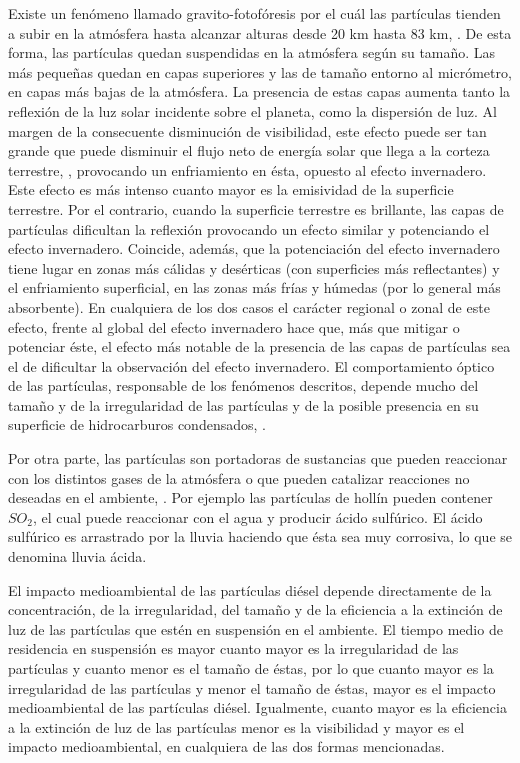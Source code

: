 \par Existe un fenómeno llamado gravito-fotofóresis por el cuál las partículas tienden a subir en la atmósfera hasta alcanzar alturas desde 20 km hasta 83 km, \cite{cheremisinetal:2005}. De esta forma, las partículas quedan suspendidas en la atmósfera según su tamaño. Las más pequeñas quedan en capas superiores y las de tamaño entorno al micrómetro, en capas más bajas de la atmósfera. La presencia de estas capas aumenta tanto la reflexión de la luz solar incidente sobre el planeta, como la dispersión de luz. Al margen de la consecuente disminución de visibilidad, este efecto puede ser tan grande que puede disminuir el flujo neto de energía solar que llega a la corteza terrestre, \cite{faxvogetal:1978}, provocando un enfriamiento en ésta, opuesto al efecto invernadero. Este efecto es más intenso cuanto mayor es la emisividad de la superficie terrestre. Por el contrario, cuando la superficie terrestre es brillante, las capas de partículas dificultan la reflexión provocando un efecto similar y potenciando el efecto invernadero. Coincide, además, que la potenciación del efecto invernadero tiene lugar en zonas más cálidas y desérticas (con superficies más reflectantes) y el enfriamiento superficial, en las zonas más frías y húmedas (por lo general más absorbente). En cualquiera de los dos casos el carácter regional o zonal de este efecto, frente al global del efecto invernadero hace que, más que mitigar o potenciar éste, el efecto más notable de la presencia de las capas de partículas sea el de dificultar la observación del efecto invernadero. El comportamiento óptico de las partículas, responsable de los fenómenos descritos, depende mucho del tamaño y de la irregularidad de las partículas y de la posible presencia en su superficie de hidrocarburos condensados, \cite{siegmannetal:1999}.

\par Por otra parte, las partículas son portadoras de sustancias que pueden reaccionar con los distintos gases de la atmósfera o que pueden catalizar reacciones no deseadas en el ambiente, \cite{merolaetal:2001}. Por ejemplo las partículas de hollín pueden contener $SO_2$, el cual puede reaccionar con el agua y producir ácido sulfúrico. El ácido sulfúrico es arrastrado por la lluvia haciendo que ésta sea muy corrosiva, lo que se denomina lluvia ácida.

\par El impacto medioambiental de las partículas diésel depende directamente de la concentración, de la irregularidad, del tamaño y de la eficiencia a la extinción de luz de las partículas que estén en suspensión en el ambiente. El tiempo medio de residencia en suspensión es mayor cuanto mayor es la irregularidad de las partículas y cuanto menor es el tamaño de éstas, por lo que cuanto mayor es la irregularidad de las partículas y menor el tamaño de éstas, mayor es el impacto medioambiental de las partículas diésel. Igualmente, cuanto mayor es la eficiencia a la extinción de luz de las partículas menor es la visibilidad y mayor es el impacto medioambiental, en cualquiera de las dos formas mencionadas. 
 
\newpage
		

\bibname